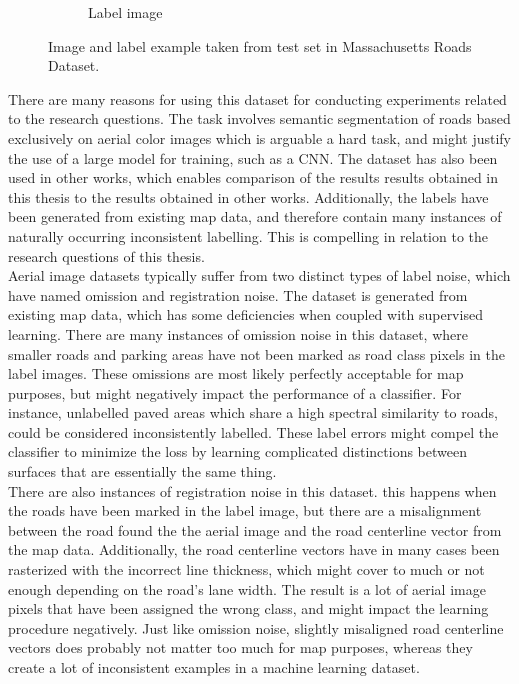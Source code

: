 \begin{figure}
\begin{subfigure}{0.48\textwidth}
\caption{Label image} \label{fig:mass_roads_example_label}
\end{subfigure}
\hspace*{\fill} %
\caption[Massachusetts Roads Dataset]{Image and label example taken from test set in Massachusetts Roads Dataset.} \label{fig:mass_roads_example}
\end{figure}


There are many reasons for using this dataset for conducting experiments related to the research questions.  The task involves semantic segmentation of roads based exclusively on aerial color images which is arguable a hard task, and might justify the use of a large model for training, such as a \ac{CNN}. The dataset has also been used in other works, which enables comparison of the results results obtained in this thesis to the results obtained in other works. Additionally, the labels have been generated from existing map data, and therefore contain many instances of naturally occurring inconsistent labelling. This is compelling in relation to the research questions of this thesis.\\

Aerial image datasets typically suffer from two distinct types of label noise, which \cite{Mnih_aerial_images_noisy} have named omission and registration noise. The dataset is generated from existing map data, which has some deficiencies when coupled with supervised learning. There are many instances of omission noise in this dataset, where smaller roads and parking areas have not been marked as road class pixels in the label images. These omissions are most likely perfectly acceptable for map purposes, but might negatively impact the performance of a classifier.  For instance, unlabelled paved areas which share a high spectral similarity to roads, could be considered inconsistently labelled. These label errors might compel the classifier to minimize the loss by learning complicated distinctions between surfaces that are essentially the same thing.\\

There are also instances of registration noise in this dataset. this happens when the roads have been marked in the label image, but there are a misalignment between the road found the the aerial image and the road centerline vector from the map data. Additionally, the road centerline vectors have in many cases been rasterized with the incorrect line thickness, which might cover to much or not enough depending on the road's lane width. The result is a lot of aerial image pixels that have been assigned the wrong class, and might impact the learning procedure negatively. Just like omission noise, slightly misaligned road centerline vectors does probably not matter too much for map purposes, whereas they create a lot of inconsistent examples in a machine learning dataset.


